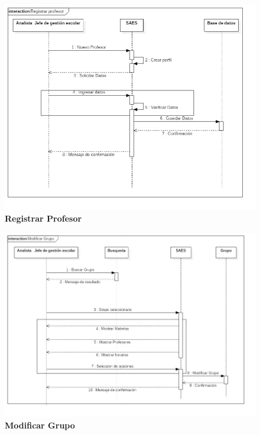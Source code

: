 \newpage
\begin{figure}[H]
  \centering
    \includegraphics[scale=0.5,angle=90]{project/Secuencia/Registrar_profesor.jpg}
  \caption{\textbf{Registrar Profesor}}
\end{figure}
\begin{figure}[H]
  \centering
    \includegraphics[scale=0.5,angle=90]{project/Secuencia/Modificar_Grupo.jpg}
  \caption{\textbf{Modificar Grupo}}
\end{figure}
